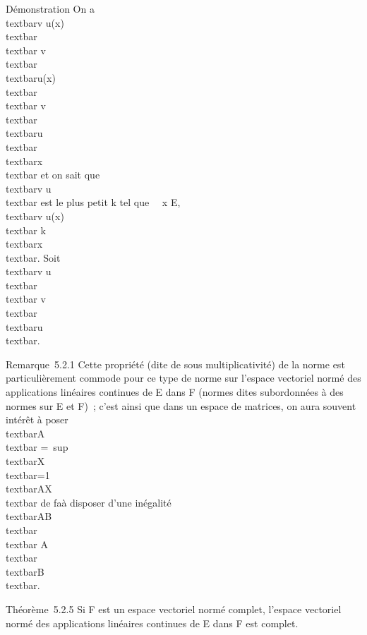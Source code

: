Démonstration On a \\textbar{}v \cdot
u(x)\\textbar{} \leq\\textbar{}
v\\textbar{}\,\\textbar{}u(x)\\textbar{}
\leq\\textbar{}
v\\textbar{}\,\\textbar{}u\\textbar{}\,\\textbar{}x\\textbar{}
et on sait que \\textbar{}v \cdot u\\textbar{}
est le plus petit k tel que \forall~~x \in E,
\\textbar{}v \cdot u(x)\\textbar{} \leq
k\\textbar{}x\\textbar{}. Soit
\\textbar{}v \cdot u\\textbar{}
\leq\\textbar{}
v\\textbar{}\,\\textbar{}u\\textbar{}.

Remarque~5.2.1 Cette propriété (dite de sous multiplicativité) de la
norme est particulièrement commode pour ce type de norme sur l'espace
vectoriel normé des applications linéaires continues de E dans F (normes
dites subordonnées à des normes sur E et F)~; c'est ainsi que dans un
espace de matrices, on aura souvent intérêt à poser
\\textbar{}A\\textbar{}
=\
sup\\textbar{}X\\textbar{}=1\\textbar{}AX\\textbar{}
de fa\ccon à disposer d'une inégalité
\\textbar{}AB\\textbar{}
\leq\\textbar{}
A\\textbar{}\,\\textbar{}B\\textbar{}.

Théorème~5.2.5 Si F est un espace vectoriel normé complet, l'espace
vectoriel normé des applications linéaires continues de E dans F est
complet.

